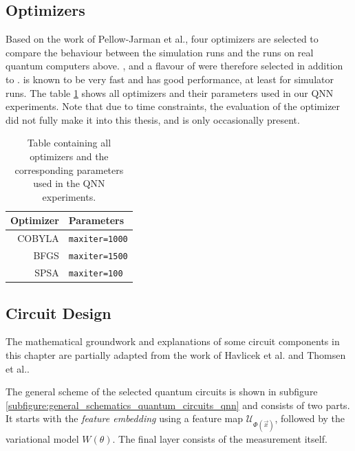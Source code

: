 \clearpage

\subsection{Optimizers}
Based on the work of Pellow-Jarman et al.\cite{pellow-jarman_comparison_2021}, four optimizers are selected to compare the behaviour between the simulation runs and the runs on real quantum computers above. ,  and a flavour of  were therefore selected in addition to .  is known to be very fast and has good performance, at least for simulator runs. The table \ref{table:qnn_optimizers_and_ parameters} shows all optimizers and their parameters used in our QNN experiments. Note that due to time constraints, the evaluation of the  optimizer did not fully make it into this thesis, and is only occasionally present.

\begin{table}[!h]
    \centering
    \begin{tabular}{rl}
    \hline
    \textbf{Optimizer}      & \textbf{Parameters}                                      \\ \hline
    COBYLA & \texttt{maxiter=1000}               \\ \hline
    BFGS & \texttt{maxiter=1500}               \\ \hline
    SPSA & \texttt{maxiter=100}                \\ \hline
    \end{tabular}
    \caption{Table containing all optimizers and the corresponding parameters used in the QNN experiments.}
    \label{table:qnn_optimizers_and_ parameters}
\end{table}

\clearpage

\subsection{Circuit Design}
The mathematical groundwork and explanations of some circuit components in this chapter are partially adapted from the work of Havlicek et al.\cite{havlicekSupervisedLearningQuantum2019} and Thomsen et al.\cite{ThomsenComparingQNNs_QSVM}.\par
The general scheme of the selected quantum circuits is shown in subfigure \ref{subfigure:general_schematics_quantum_circuits_qnn} and consists of two parts. It starts with the \textit{feature embedding} using a feature map $\mathcal{U}_{\Phi(\Vec{x})}$, followed by the variational model $W(\theta)$. The final layer consists of the measurement itself.

